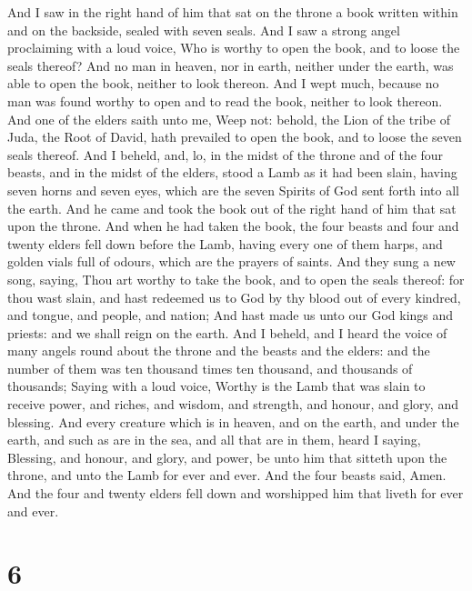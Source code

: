  And I saw in the right hand of him that sat on the throne
a book written within and on the backside, sealed with seven seals.
 And I saw a strong angel proclaiming with a loud voice,
Who is worthy to open the book, and to loose the seals thereof?
 And no man in heaven, nor in earth, neither under the
earth, was able to open the book, neither to look thereon.
 And I wept much, because no man was found worthy to open
and to read the book, neither to look thereon.  And one of
the elders saith unto me, Weep not: behold, the Lion of the tribe of
Juda, the Root of David, hath prevailed to open the book, and to loose
the seven seals thereof.  And I beheld, and, lo, in the
midst of the throne and of the four beasts, and in the midst of the
elders, stood a Lamb as it had been slain, having seven horns and seven
eyes, which are the seven Spirits of God sent forth into all the earth.
 And he came and took the book out of the right hand of
him that sat upon the throne.  And when he had taken the
book, the four beasts and four and twenty elders fell down before the
Lamb, having every one of them harps, and golden vials full of odours,
which are the prayers of saints.  And they sung a new
song, saying, Thou art worthy to take the book, and to open the seals
thereof: for thou wast slain, and hast redeemed us to God by thy blood
out of every kindred, and tongue, and people, and nation;
 And hast made us unto our God kings and priests: and we
shall reign on the earth.  And I beheld, and I heard the
voice of many angels round about the throne and the beasts and the
elders: and the number of them was ten thousand times ten thousand, and
thousands of thousands;  Saying with a loud voice, Worthy
is the Lamb that was slain to receive power, and riches, and wisdom, and
strength, and honour, and glory, and blessing.  And every
creature which is in heaven, and on the earth, and under the earth, and
such as are in the sea, and all that are in them, heard I saying,
Blessing, and honour, and glory, and power, be unto him that sitteth
upon the throne, and unto the Lamb for ever and ever. 
And the four beasts said, Amen. And the four and twenty elders fell down
and worshipped him that liveth for ever and ever.

\hypertarget{section-5}{%
\section{6}\label{section-5}}

